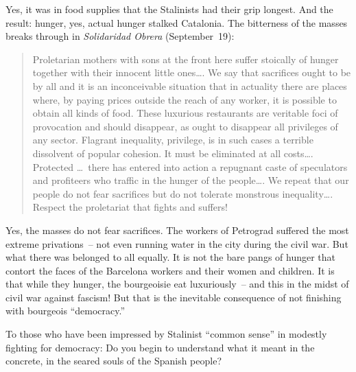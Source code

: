 Yes, it was in food supplies that the Stalinists had their grip long\-est. And the result: hunger\kn, yes, actual hunger stalked Catalonia. The bitterness of the masses breaks through in \emph{Solidaridad Obrera\indexSolidaridadObrera} (September~19):

\begin{quotation}
  Proletarian mothers with sons at the front here suffer stoically of hunger together with their innocent little ones\dots.
  We say that sacrifices ought to be by all and it is an inconceivable situation that in actuality there are places where, by paying prices outside the reach of any worker, it is possible to obtain all kinds of food. These luxurious restaurants are veritable foci of provocation and should disappear, as ought to disappear all privileges of any sector. Flagrant inequality, privilege, is in such cases a terrible dissolvent of popular cohesion. It must be eliminated at all costs\dots. Protected \dots\ there has entered into action a repugnant caste of speculators and profiteers who traffic in the hunger of the people\dots.
  We repeat that our people do not fear sacrifices but do not tolerate monstrous inequality\dots. Respect the proletariat that fights and suffers!
\end{quotation}

Yes, the masses do not fear sacrifices. The workers of Petrograd suffered the most extreme privations~-- not even running water in the city during the civil war. But what there was belonged to all equally. It is not the bare pangs of hunger that contort the faces of the Barcelona workers and their women and children. It is that while they hunger, the bourgeoisie eat luxuriously~-- and this in the midst of civil war against fascism! But that is the inevitable consequence of not finishing with bourgeois ``democracy.\kn\kn''

To those who have been impressed by Stalinist ``common sense'' in modestly fighting for democracy: Do you begin to understand what it meant in the concrete, in the seared souls of the Spanish people?
